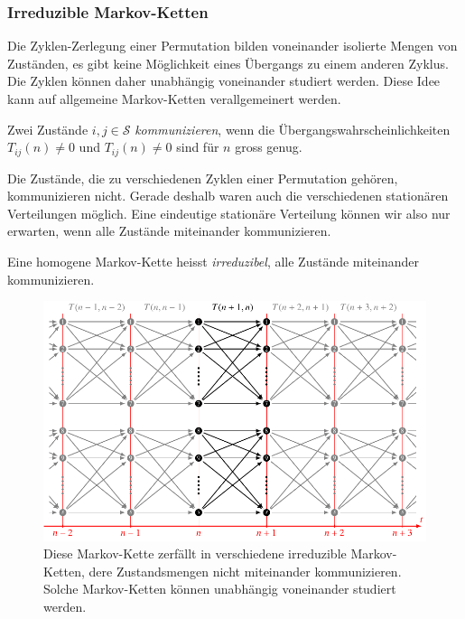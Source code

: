 \subsubsection{Irreduzible Markov-Ketten}
Die Zyklen-Zerlegung einer Permutation bilden voneinander isolierte
Mengen von Zuständen, es gibt keine Möglichkeit eines Übergangs zu
einem anderen Zyklus.
Die Zyklen können daher unabhängig voneinander studiert werden.
Diese Idee kann auf allgemeine Markov-Ketten verallgemeinert werden.

\begin{definition}
Zwei Zustände $i,j\in\mathcal{S}$ {\em kommunizieren}, wenn die
%
Übergangswahrscheinlichkeiten $T_{i\!j}(n) \ne 0$ und $T_{i\!j}(n)\ne 0$ sind
für $n$ gross genug.
\end{definition}

Die Zustände, die zu verschiedenen Zyklen einer Permutation gehören,
kommunizieren nicht.
Gerade deshalb waren auch die verschiedenen stationären Verteilungen
möglich.
Eine eindeutige stationäre Verteilung können wir also nur erwarten,
wenn alle Zustände miteinander kommunizieren.

\begin{definition}
Eine homogene Markov-Kette heisst {\em irreduzibel}, alle Zustände miteinander
kommunizieren.
\end{definition}

\begin{figure}
\centering
\includegraphics{chapters/80-wahrscheinlichkeit/images/markov2.pdf}
\caption{Diese Markov-Kette zerfällt in verschiedene irreduzible
Markov-Ketten, dere Zustandsmengen nicht miteinander kommunizieren.
Solche Markov-Ketten können unabhängig voneinander studiert werden.
\label{buch:wahrscheinlichkeit:fig:markovzerfall}}
\end{figure}

